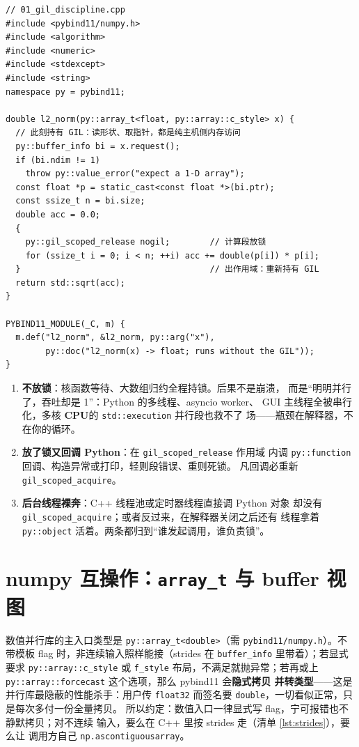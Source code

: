 \documentclass[12pt,a4paper,fontset=fandol]{ctexbook}
\newcommand{\Tp}[1]{\texttt{#1}}
\newcommand{\Bk}{\allowbreak}
\newcommand{\Dom}[1]{\textsf{\bfseries #1}}
\newcommand{\CPU}{\Dom{CPU}}
\begin{document}
\begin{lstlisting}[style=cppstyle,caption={GIL 的正确圈法：持锁读元数据、放锁做计算与等待},label={lst:gil}]
// 01_gil_discipline.cpp
#include <pybind11/numpy.h>
#include <algorithm>
#include <numeric>
#include <stdexcept>
#include <string>
namespace py = pybind11;

double l2_norm(py::array_t<float, py::array::c_style> x) {
  // 此刻持有 GIL：读形状、取指针，都是纯主机侧内存访问
  py::buffer_info bi = x.request();
  if (bi.ndim != 1)
    throw py::value_error("expect a 1-D array");
  const float *p = static_cast<const float *>(bi.ptr);
  const ssize_t n = bi.size;
  double acc = 0.0;
  {
    py::gil_scoped_release nogil;        // 计算段放锁
    for (ssize_t i = 0; i < n; ++i) acc += double(p[i]) * p[i];
  }                                      // 出作用域：重新持有 GIL
  return std::sqrt(acc);
}

PYBIND11_MODULE(_C, m) {
  m.def("l2_norm", &l2_norm, py::arg("x"),
        py::doc("l2_norm(x) -> float; runs without the GIL"));
}
\end{lstlisting}

\begin{warning}[title={三种典型 GIL 误用}]
\begin{enumerate}[label=\arabic*.)]
\item \textbf{不放锁}：核函数等待、大数组归约全程持锁。后果不是崩溃，
而是``明明并行了，吞吐却是 1''：Python 的多线程、asyncio worker、
GUI 主线程全被串行化，多核 \CPU{}的 \Tp{std::execution} 并行段也救不了
场——瓶颈在解释器，不在你的循环。
\item \textbf{放了锁又回调 Python}：在 \Tp{gil\_{\Bk}scoped\_{\Bk}release} 作用域
内调 \Tp{py::function} 回调、构造异常或打印，轻则段错误、重则死锁。
凡回调必重新 \Tp{gil\_{\Bk}scoped\_{\Bk}acquire}。
\item \textbf{后台线程裸奔}：C++ 线程池或定时器线程直接调 Python 对象
却没有 \Tp{gil\_{\Bk}scoped\_{\Bk}acquire}；或者反过来，在解释器关闭之后还有
线程拿着 \Tp{py::object} 活着。两条都归到``谁发起调用，谁负责锁''。
\end{enumerate}
\end{warning}

\section{numpy 互操作：\Tp{array\_t} 与 buffer 视图}

数值并行库的主入口类型是 \Tp{py::array\_t<double>}（需
\Tp{pybind11/numpy.h}）。不带模板 flag 时，非连续输入照样能接（strides
在 \Tp{buffer\_info} 里带着）；若显式要求 \Tp{py::array::c\_style}
或 \Tp{f\_style} 布局，不满足就抛异常；若再或上
\Tp{py::array::forcecast} 这个选项，那么 pybind11 会\textbf{隐式拷贝
并转类型}——这是并行库最隐蔽的性能杀手：用户传 \Tp{float32} 而签名要
\Tp{double}，一切看似正常，只是每次多付一份全量拷贝。
所以约定：数值入口一律显式写 flag，宁可报错也不静默拷贝；对不连续
输入，要么在 C++ 里按 strides 走（清单 \ref{lst:strides}），要么让
调用方自己 \Tp{np.ascontiguousarray}。
\end{document}
